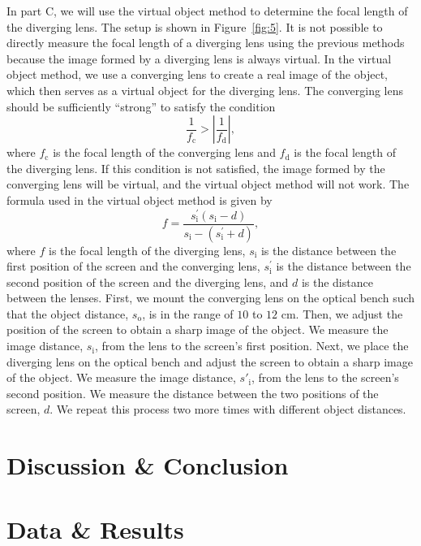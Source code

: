 \documentclass[10pt]{article}
\begin{document}
In part C, we will use the virtual object method to determine the focal length of the diverging lens. The setup is shown in Figure~\ref{fig:5}. It is not possible to directly measure the focal length of a diverging lens using the previous methods because the image formed by a diverging lens is always virtual. In the virtual object method, we use a converging lens to create a real image of the object, which then serves as a virtual object for the diverging lens. The converging lens should be sufficiently \enquote{strong} to satisfy the condition 
\begin{equation}
  \dfrac{1}{f_{\text{c}}} > \left| \dfrac{1}{f_{\text{d}}} \right|,
\end{equation}
where $f_{\text{c}}$ is the focal length of the converging lens and $f_{\text{d}}$ is the focal length of the diverging lens. If this condition is not satisfied, the image formed by the converging lens will be virtual, and the virtual object method will not work. The formula used in the virtual object method is given by
\begin{equation}
  f = \dfrac{s^{'}_{\text{i}} \left( s_{\text{i}} - d \right)}{s_{\text{i}} - \left( s^{'}_{\text{i}} + d \right)},
\end{equation}
where $f$ is the focal length of the diverging lens, $s_{\text{i}}$ is the distance between the first position of the screen and the converging lens, $s^{'}_{\text{i}}$ is the distance between the second position of the screen and the diverging lens, and $d$ is the distance between the lenses. First, we mount the converging lens on the optical bench such that the object distance, $s_{\text{o}}$, is in the range of $10$ to $12$ cm. Then, we adjust the position of the screen to obtain a sharp image of the object. We measure the image distance, $s_{\text{i}}$, from the lens to the screen's first position. Next, we place the diverging lens on the optical bench and adjust the screen to obtain a sharp image of the object. We measure the image distance, $s'_{\text{i}}$, from the lens to the screen's second position. We measure the distance between the two positions of the screen, $d$. We repeat this process two more times with different object distances.

\section{Discussion \& Conclusion}

\section{Data \& Results}
\end{document}
